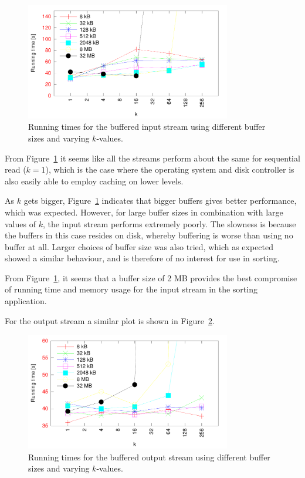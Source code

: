 \documentclass[a4paper,12pt]{article}
\begin{document}
\begin{figure}[h!]
  \centering
  \includegraphics[width=0.8\textwidth]{buffered_input}
  \caption{Running times for the buffered input stream using different
    buffer sizes and varying $k$-values.}
  \label{fig:buffered-input}
\end{figure}

From Figure~\ref{fig:buffered-input} it seems like all the streams
perform about the same for sequential read ($k = 1$), which is the
case where the operating system and disk controller is also easily
able to employ caching on lower levels.

As $k$ gets bigger, Figure~\ref{fig:buffered-input} indicates that
bigger buffers gives better performance, which was expected. However,
for large buffer sizes in combination with large values of $k$, the
input stream performs extremely poorly. The slowness is because the
buffers in this case resides on disk, whereby buffering is worse than
using no buffer at all. Larger choices of buffer size was also tried,
which as expected showed a similar behaviour, and is therefore of no
interest for use in sorting.

From Figure~\ref{fig:buffered-input}, it seems that a buffer size of 2
MB provides the best compromise of running time and memory usage for
the input stream in the sorting application.

For the output stream a similar plot is shown in
Figure~\ref{fig:buffered-output}.

\begin{figure}[h!]
  \centering
  \includegraphics[width=0.8\textwidth]{buffered_output}
  \caption{Running times for the buffered output stream using different
    buffer sizes and varying $k$-values.}
  \label{fig:buffered-output}
\end{figure}
\end{document}
